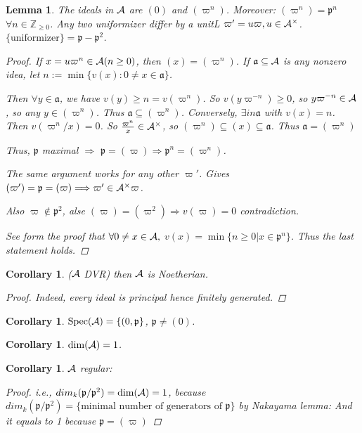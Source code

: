 \documentclass[11pt]{article}
\newtheorem{lemma}[thm]{Lemma}
\newtheorem{cor}[thm]{Corollary}
\newcommand{\intg}{\mathbb Z}
\newcommand{\sca}{{\mathfrak a}}
\newcommand{\scp}{{\mathfrak p}}
\newcommand{\cala}{{\cal A}}
\newcommand{\Lrta}{\Longrightarrow}
\begin{document}
\begin{lemma}
The ideals in $\cala$ are $(0)$ and $(\varpi^n)$. Moreover: $(\varpi^n)=\scp^n$ $\forall n\in \intg_{\geq 0}$. Any two uniformizer differ by a unitL $\varpi'=u\varpi,u\in \cala^\times$.
$\{\text{uniformizer}\}=\scp-\scp^2$.
\begin{proof}
If $x=u\varpi^n\in \cala (n\geq 0)$, then $(x)=(\varpi^n)$. If $\sca\subseteq \cala$ is any nonzero idea, let $n:=\min\{v(x):0\neq x\in \sca\}$.

Then $\forall y\in \sca$, we have $v(y)\geq n =v(\varpi^n)$. So $v(y\varpi^{-n})\geq 0$, so $y\varpi^{-n}\in\cala$, so any $y\in (\varpi^n)$. Thus $\sca\subseteq (\varpi^n)$. Conversely, $\exists in \sca$ with $v(x)=n$. Then $v(\varpi^n/x)=0$. So $\frac{\varpi^n}{x}\in \cala^\times$, so $(\varpi^n)\subseteq (x)\subseteq \sca$. Thus $\sca=(\varpi^n)$

Thus, $\scp$ maximal $\Lrta$ $\scp=(\varpi)\Lrta \scp^n=(\varpi^n)$.

The same argument works for any other $\varpi'$. Gives $(\varpi')=\scp=(\varpi)\Lrta \varpi'\in\cala^\times\varpi$.

Also $\varpi\notin\scp^2$, alse $(\varpi)=(\varpi^2)\Lrta v(\varpi)=0$ contradiction.

See form the proof that $\forall 0\neq x\in \cala,$
$v(x)=\min\{n\geq 0|x\in \scp^n\}$. Thus the last statement holds.
\end{proof}
\end{lemma}
\begin{cor}
($\cala$ DVR) then $\cala$ is Noetherian.
\begin{proof}
Indeed, every ideal is principal hence finitely generated.
\end{proof}
\end{cor}

\begin{cor}
$\text{Spec}(\cala)=\{(0,\scp\}$, $\scp\neq (0)$.
\end{cor}

\begin{cor}
$\text{dim}(\cala)=1$.
\end{cor}

\begin{cor}
$\cala$ regular:
\begin{proof}
i.e., $dim_k(\scp/\scp^2)=\text{dim}(\cala)=1$, because $dim_k(\scp/\scp^2)=\{\text{minimal number of generators of $\scp$}\}$ by Nakayama lemma:
And it equals to 1 because $\scp=(\varpi)$
\end{proof}
\end{cor}
\end{document}
